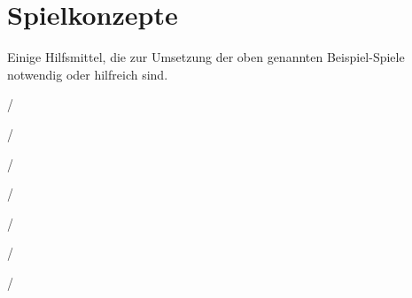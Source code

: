 \chapter{Spielkonzepte}



Einige Hilfsmittel, die zur Umsetzung der oben genannten Beispiel-Spiele notwendig oder
hilfreich sind.







/%

/%

/%

/%

/%

/%

/%
\newpage